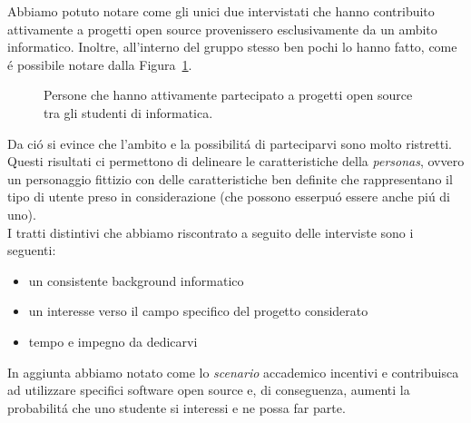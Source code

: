 \documentclass[12pt]{article} %
\begin{document}
Abbiamo potuto notare come gli unici due intervistati che hanno contribuito attivamente a progetti open source provenissero esclusivamente da un ambito informatico. Inoltre, all'interno del gruppo stesso ben pochi lo hanno fatto, come \'e possibile notare dalla Figura~\ref{fig:distribuzioneInformatica}.

\begin{figure}[H]
\caption{Persone che hanno attivamente partecipato a progetti open source tra gli studenti di informatica.}
\label{fig:distribuzioneInformatica}
\end{figure}

Da ci\'o si evince che l'ambito e la possibilit\'a di parteciparvi sono molto ristretti. Questi risultati ci permettono di delineare le caratteristiche della \emph{personas}, ovvero un personaggio fittizio con delle caratteristiche ben definite che rappresentano il tipo di utente preso in considerazione (che possono esserpu\'o essere anche pi\'u di uno).\\
I tratti distintivi che abbiamo riscontrato a seguito delle interviste sono i seguenti:
\begin{itemize}
\item un consistente background informatico
\item un interesse verso il campo specifico del progetto considerato
\item tempo e impegno da dedicarvi
\end{itemize}

In aggiunta abbiamo notato come lo \emph{scenario} accademico incentivi e contribuisca ad utilizzare specifici software open source e, di conseguenza, aumenti la probabilit\'a che uno studente si interessi e ne possa far parte.
\end{document}
